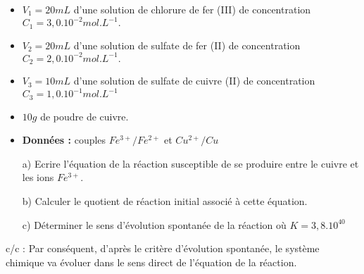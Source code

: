 \documentclass[12pt]{article}
\begin{document}
\begin{itemize}

	\item  $V_1 = 20 mL$ d'une solution de chlorure de fer (III) de concentration $C_1 = 3,0.10^{- 2} mol.L^{-1}.$

	\item $V_2 = 20 mL$ d'une solution de sulfate de fer (II) de concentration $C_2 = 2,0.10^{ -2} mol.L^{-1}.$

	\item $V_3 = 10 mL$ d'une solution de sulfate de cuivre (II) de concentration $C_3 = 1,0.10^{-1} mol.L^{-1}$

	\item $10 g$ de poudre de cuivre.
	\item \textbf{Données :} couples  $Fe^{3+} / Fe^{2+}$ et $Cu^{2+}/ Cu$
	\item[a) ] Ecrire l'équation de la réaction susceptible de se produire entre le cuivre et les ions $Fe^{3+}$.

	\item[b)] Calculer le quotient de réaction initial associé à cette équation.
	\item[c)] Déterminer le sens d'évolution spontanée de la réaction où $K = 3,8.10^{ 40}$

\end{itemize}
c/c : Par conséquent, d'après le critère d'évolution spontanée, le système chimique va évoluer dans le sens
direct de l'équation de la réaction.







\end{document}
